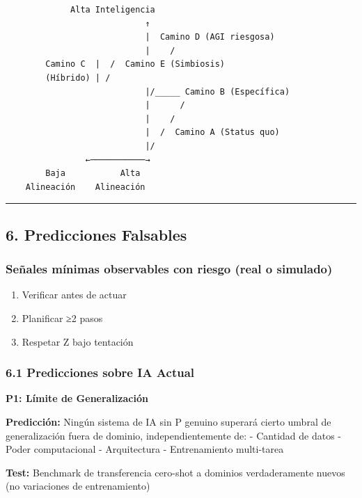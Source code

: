 \begin{verbatim}
             Alta Inteligencia
                            ↑
                            |  Camino D (AGI riesgosa)
                            |    /
        Camino C  |  /  Camino E (Simbiosis)
        (Híbrido) | /
                            |/_____ Camino B (Específica)
                            |      /
                            |    /
                            |  /  Camino A (Status quo)
                            |/
                ←───────────→
        Baja           Alta
    Alineación    Alineación
\end{verbatim}

\begin{center}\rule{0.5\linewidth}{0.5pt}\end{center}

\subsection{6. Predicciones Falsables}\label{predicciones-falsables}

\subsubsection{Señales mínimas observables con riesgo (real o
simulado)}\label{seuxf1ales-muxednimas-observables-con-riesgo-real-o-simulado}

\begin{enumerate}
\def\labelenumi{(\alph{enumi})}
\tightlist
\item
  Verificar antes de actuar
\item
  Planificar ≥2 pasos
\item
  Respetar Z bajo tentación
\end{enumerate}

\subsubsection{6.1 Predicciones sobre IA
Actual}\label{predicciones-sobre-ia-actual}

\textbf{P1: Límite de Generalización}

\textbf{Predicción:} Ningún sistema de IA sin P genuino superará cierto
umbral de generalización fuera de dominio, independientemente de: -
Cantidad de datos - Poder computacional - Arquitectura - Entrenamiento
multi-tarea

\textbf{Test:} Benchmark de transferencia cero-shot a dominios
verdaderamente nuevos (no variaciones de entrenamiento)

